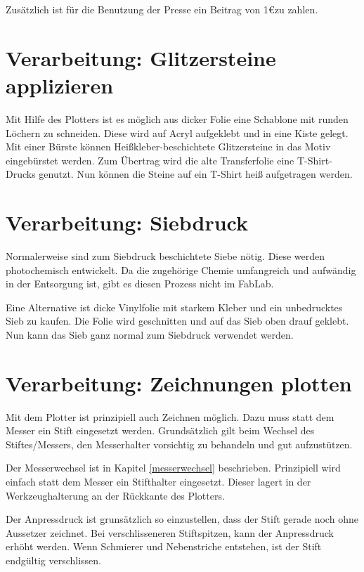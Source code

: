 \documentclass{\basedir/fablab-document}
\renewcommand{\texteuro}{\euro}
\begin{document}
Zusätzlich ist für die Benutzung der Presse ein Beitrag von 1\texteuro zu zahlen.

\section{Verarbeitung: Glitzersteine applizieren}
Mit Hilfe des Plotters ist es möglich aus dicker Folie eine Schablone mit runden Löchern zu schneiden.
Diese wird auf Acryl aufgeklebt und in eine Kiste gelegt.
Mit einer Bürste können Heißkleber-beschichtete Glitzersteine in das Motiv eingebürstet werden.
Zum Übertrag wird die alte Transferfolie eine T-Shirt-Drucks genutzt.
Nun können die Steine auf ein T-Shirt heiß aufgetragen werden.
\section{Verarbeitung: Siebdruck}
Normalerweise sind zum Siebdruck beschichtete Siebe nötig.
Diese werden photochemisch entwickelt.
Da die zugehörige Chemie umfangreich und aufwändig in der Entsorgung ist, gibt es diesen Prozess nicht im FabLab.

Eine Alternative ist dicke Vinylfolie mit starkem Kleber und ein unbedrucktes Sieb zu kaufen.
Die Folie wird geschnitten und auf das Sieb oben drauf geklebt.
Nun kann das Sieb ganz normal zum Siebdruck verwendet werden.
\section{Verarbeitung: Zeichnungen plotten}
Mit dem Plotter ist prinzipiell auch Zeichnen möglich.
Dazu muss statt dem Messer ein Stift eingesetzt werden.
Grundsätzlich gilt beim Wechsel des Stiftes/Messers, den Messerhalter vorsichtig zu behandeln und gut aufzustützen.

Der Messerwechsel ist in Kapitel \ref{messerwechsel} beschrieben.
Prinzipiell wird einfach statt dem Messer ein Stifthalter eingesetzt.
Dieser lagert in der Werkzeughalterung an der Rückkante des Plotters.

Der Anpressdruck ist grunsätzlich so einzustellen, dass der Stift gerade noch ohne Aussetzer zeichnet.
Bei verschlisseneren Stiftspitzen, kann der Anpressdruck erhöht werden.
Wenn Schmierer und Nebenstriche entstehen, ist der Stift endgültig verschlissen.

\end{document}
